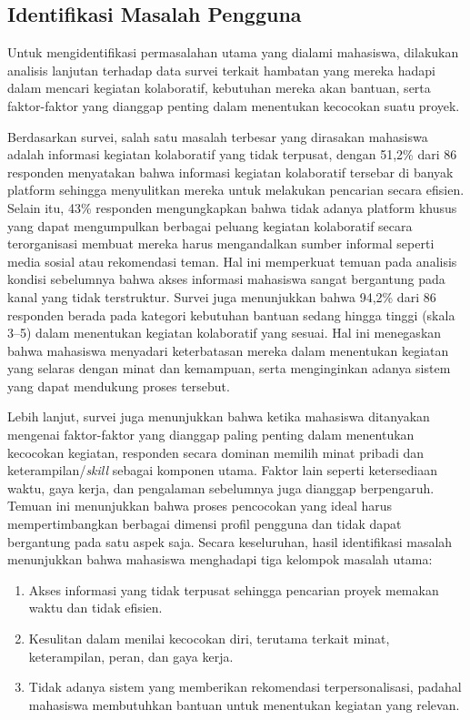 \subsection{Identifikasi Masalah Pengguna}

Untuk mengidentifikasi permasalahan utama yang dialami mahasiswa, dilakukan analisis lanjutan terhadap data survei terkait hambatan yang mereka hadapi dalam mencari kegiatan kolaboratif, kebutuhan mereka akan bantuan, serta faktor-faktor yang dianggap penting dalam menentukan kecocokan suatu proyek.

Berdasarkan survei, salah satu masalah terbesar yang dirasakan mahasiswa adalah informasi kegiatan kolaboratif yang tidak terpusat, dengan 51,2\% dari 86 responden menyatakan bahwa informasi kegiatan kolaboratif tersebar di banyak platform sehingga menyulitkan mereka untuk melakukan pencarian secara efisien. Selain itu, 43\% responden mengungkapkan bahwa tidak adanya platform khusus yang dapat mengumpulkan berbagai peluang kegiatan kolaboratif secara terorganisasi membuat mereka harus mengandalkan sumber informal seperti media sosial atau rekomendasi teman. Hal ini memperkuat temuan pada analisis kondisi sebelumnya bahwa akses informasi mahasiswa sangat bergantung pada kanal yang tidak terstruktur. Survei juga menunjukkan bahwa 94,2\% dari 86 responden berada pada kategori kebutuhan bantuan sedang hingga tinggi (skala 3--5) dalam menentukan kegiatan kolaboratif yang sesuai. Hal ini menegaskan bahwa mahasiswa menyadari keterbatasan mereka dalam menentukan kegiatan yang selaras dengan minat dan kemampuan, serta menginginkan adanya sistem yang dapat mendukung proses tersebut.

Lebih lanjut, survei juga menunjukkan bahwa ketika mahasiswa ditanyakan mengenai faktor-faktor yang dianggap paling penting dalam menentukan kecocokan kegiatan, responden secara dominan memilih minat pribadi dan keterampilan/\emph{skill} sebagai komponen utama. Faktor lain seperti ketersediaan waktu, gaya kerja, dan pengalaman sebelumnya juga dianggap berpengaruh. Temuan ini menunjukkan bahwa proses pencocokan yang ideal harus mempertimbangkan berbagai dimensi profil pengguna dan tidak dapat bergantung pada satu aspek saja. Secara keseluruhan, hasil identifikasi masalah menunjukkan bahwa mahasiswa menghadapi tiga kelompok masalah utama:

\begin{enumerate}
  \item Akses informasi yang tidak terpusat sehingga pencarian proyek memakan waktu dan tidak efisien.
  \item Kesulitan dalam menilai kecocokan diri, terutama terkait minat, keterampilan, peran, dan gaya kerja.
  \item Tidak adanya sistem yang memberikan rekomendasi terpersonalisasi, padahal mahasiswa membutuhkan bantuan untuk menentukan kegiatan yang relevan.
\end{enumerate}

